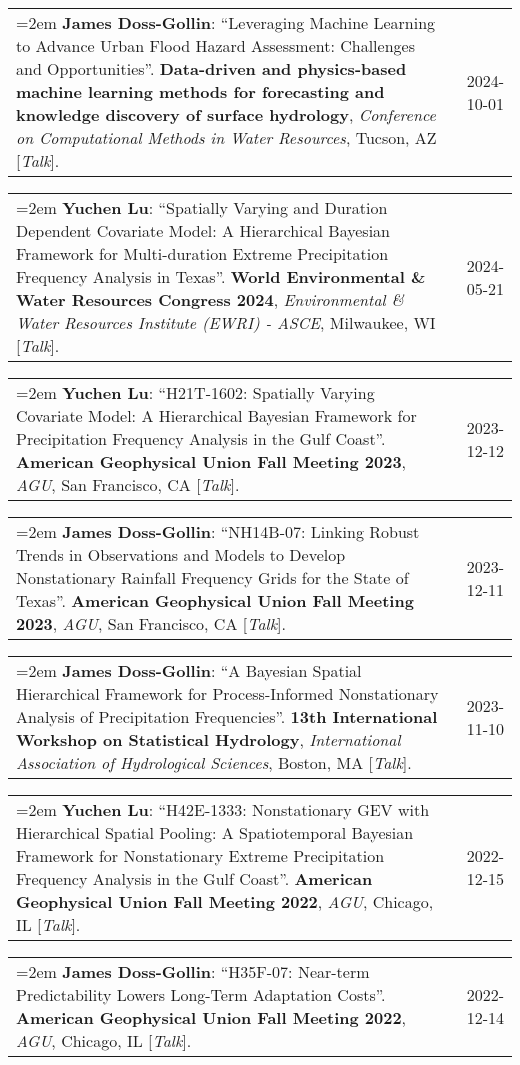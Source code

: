 \documentclass[10pt,oneside]{article}
\makeatletter
\newenvironment{alignedentrieshang}[1][2em]{%
  \noindent%
}{%
}
\newcommand{\hangingitem}[2]{%
  \noindent%
  \begin{tabular*}{\textwidth}{@{}p{0.85\textwidth}@{\extracolsep{\fill}}r@{}}%
    \hangindent=2em \hangafter=1 #1 & #2%
  \end{tabular*}%
}
\makeatother
\begin{document}
\begin{alignedentrieshang}
\hangingitem{\textbf{James Doss-Gollin}: \enquote{Leveraging Machine Learning to Advance Urban Flood Hazard Assessment: Challenges and Opportunities}. \textbf{Data-driven and physics-based machine learning methods for forecasting and knowledge discovery of surface hydrology}, \textit{Conference on Computational Methods in Water Resources}, Tucson, AZ [\textit{Talk}].}{2024-10-01}



\hangingitem{\textcolor{RiceBlue}{\textbf{Yuchen Lu}}: \enquote{Spatially Varying and Duration Dependent Covariate Model: A Hierarchical Bayesian Framework for Multi-duration Extreme Precipitation Frequency Analysis in Texas}. \textbf{World Environmental \& Water Resources Congress 2024}, \textit{Environmental \& Water Resources Institute (EWRI) - ASCE}, Milwaukee, WI [\textit{Talk}].}{2024-05-21}



\hangingitem{\textcolor{RiceBlue}{\textbf{Yuchen Lu}}: \enquote{H21T-1602: Spatially Varying Covariate Model: A Hierarchical Bayesian Framework for Precipitation Frequency Analysis in the Gulf Coast}. \textbf{American Geophysical Union Fall Meeting 2023}, \textit{AGU}, San Francisco, CA [\textit{Talk}].}{2023-12-12}



\hangingitem{\textbf{James Doss-Gollin}: \enquote{NH14B-07: Linking Robust Trends in Observations and Models to Develop Nonstationary Rainfall Frequency Grids for the State of Texas}. \textbf{American Geophysical Union Fall Meeting 2023}, \textit{AGU}, San Francisco, CA [\textit{Talk}].}{2023-12-11}



\hangingitem{\textbf{James Doss-Gollin}: \enquote{A Bayesian Spatial Hierarchical Framework for Process-Informed Nonstationary Analysis of Precipitation Frequencies}. \textbf{13th International Workshop on Statistical Hydrology}, \textit{International Association of Hydrological Sciences}, Boston, MA [\textit{Talk}].}{2023-11-10}



\hangingitem{\textcolor{RiceBlue}{\textbf{Yuchen Lu}}: \enquote{H42E-1333: Nonstationary GEV with Hierarchical Spatial Pooling: A Spatiotemporal Bayesian Framework for Nonstationary Extreme Precipitation Frequency Analysis in the Gulf Coast}. \textbf{American Geophysical Union Fall Meeting 2022}, \textit{AGU}, Chicago, IL [\textit{Talk}].}{2022-12-15}



\hangingitem{\textbf{James Doss-Gollin}: \enquote{H35F-07: Near-term Predictability Lowers Long-Term Adaptation Costs}. \textbf{American Geophysical Union Fall Meeting 2022}, \textit{AGU}, Chicago, IL [\textit{Talk}].}{2022-12-14}




\end{alignedentrieshang}
\end{document}
